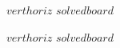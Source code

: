 \documentclass[letter]{article}
\begin{document}
	\PuzzleSolution[true]
	\begin{Puzzle}{$vert$}{$horiz$}
		$solvedboard$
	\end{Puzzle}
\newpage
	\PuzzleUnsolved
	\begin{Puzzle}{$vert$}{$horiz$}
		$solvedboard$
	\end{Puzzle}
\end{document}
